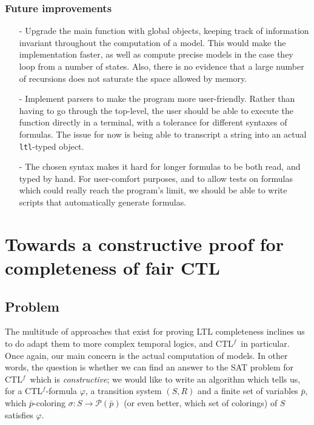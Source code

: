 \documentclass[11pt]{article}
\newcommand{\CTLf}{{CTL$^f$}}
\newcommand{\phii}{{\varphi}}
\theoremstyle{definition}
\begin{document}
\subsubsection*{Future improvements}
\begin{itemize}
    \item [-] Upgrade the main function with global objects, keeping track of information invariant throughout the computation of a model. This would make the implementation faster, as well as compute precise models in the case they loop from a number of states. Also, there is no evidence that a large number of recursions does not saturate the space allowed by memory.
    \item [-] Implement parsers to make the program more user-friendly. Rather than having to go through the top-level, the user should be able to execute the function directly in a terminal, with a tolerance for different syntaxes of formulas. The issue for now is being able to transcript a string into an actual {\tt ltl}-typed object.
    \item [-] The chosen syntax makes it hard for longer formulas to be both read, and typed by hand. For user-comfort purposes, and to allow tests on formulas which could really reach the program's limit, we should be able to write scripts that automatically generate formulas.
\end{itemize}


\section{Towards a constructive proof for completeness of fair CTL}\label{SecCTLfcomp}

\subsection*{Problem}
The multitude of approaches that exist for proving LTL completeness inclines us to do adapt them to more complex temporal logics,
and \CTLf~in particular. Once again, our main concern is the actual computation of models. In other words, the question is
whether we can find an answer to the SAT problem for \CTLf~which is \emph{constructive}; we would like to write an algorithm 
which tells us, for a \CTLf-formula $\phii$, a transition system $(S,R)$ and a finite set of variables $\bar{p}$, which $\bar{p}$-coloring 
$\sigma : S \to \mathcal{P}(\bar{p})$ (or even better, which set of colorings) of $S$ satisfies $\phii$.
\end{document}
